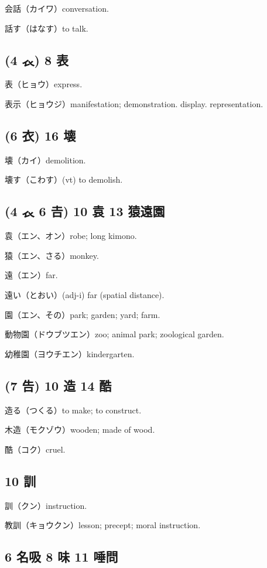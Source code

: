 会話（カイワ）conversation.

話す（はなす）to talk.

\subsection{(4 𧘇) 8 表}

表（ヒョウ）express.

表示（ヒョウジ）manifestation; demonstration. display. representation.

\subsection{(6 衣) 16 壊}

壊（カイ）demolition.

壊す（こわす）(vt) to demolish.

\subsection{(4 𧘇 6 𠮷) 10 袁 13 猿遠園}

袁（エン、オン）robe; long kimono.

猿（エン、さる）monkey.

遠（エン）far.

遠い（とおい）(adj-i) far (spatial distance).

園（エン、その）park; garden; yard; farm.

動物園（ドウブツエン）zoo; animal park; zoological garden.

幼稚園（ヨウチエン）kindergarten.

\subsection{(7 告) 10 造 14 酷}

造る（つくる）to make; to construct.

木造（モクゾウ）wooden; made of wood.

酷（コク）cruel.

\subsection{10 訓}

訓（クン）instruction.

教訓（キョウクン）lesson; precept; moral instruction.

\subsection{6 名吸 8 味 11 唾問}

